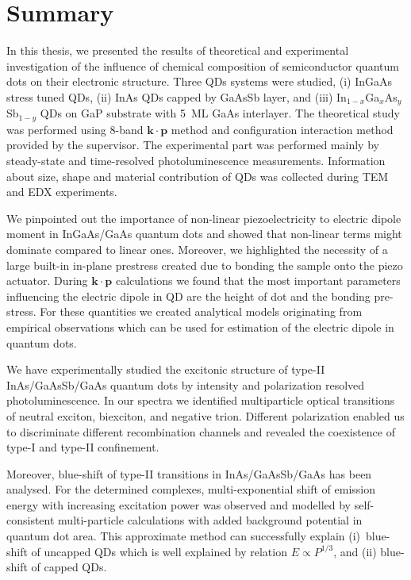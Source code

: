 
\chapter{Summary}\label{chap:summary}

In this thesis, we presented the results of theoretical and experimental investigation of the influence of chemical composition of semiconductor quantum dots on their electronic structure. Three QDs systems were studied, (i) InGaAs stress tuned QDs, (ii) InAs QDs capped by GaAsSb layer, and (iii) In$_{1-x}$Ga$_x$As$_y$Sb$_{1-y}$ QDs on GaP substrate with 5~ML GaAs interlayer. The theoretical study was performed using 8-band $\mathbf{k\cdot p}$ method and configuration interaction method provided by the supervisor. The experimental part was performed mainly by steady-state and time-resolved photoluminescence measurements. Information about size, shape and material contribution of QDs was collected during TEM and EDX experiments.

We pinpointed out the importance of non-linear piezoelectricity to electric dipole moment in InGaAs/GaAs quantum dots and showed that non-linear terms might dominate compared to linear ones. Moreover, we highlighted the necessity of a large built-in in-plane prestress created due to bonding the sample onto the piezo actuator. During $\mathbf{k\cdot p}$ calculations we found that the most important parameters influencing the electric dipole in QD are the height of dot and the bonding pre-stress. For these quantities we created analytical models originating from empirical observations which can be used for estimation of the electric dipole in quantum dots.

We have experimentally studied the excitonic structure of type-II InAs/GaAsSb/GaAs quantum dots by intensity and polarization resolved photoluminescence. In our spectra we identified multiparticle optical transitions of neutral exciton, biexciton, and negative trion. Different polarization enabled us to discriminate different recombination channels and revealed the coexistence of type-I and type-II confinement.

Moreover, blue-shift of type-II transitions in InAs/GaAsSb/GaAs has been analysed. For the determined complexes, multi-exponential shift of emission energy with increasing excitation power was observed and modelled by self-consistent multi-particle calculations with added background potential in quantum dot area. This approximate method can successfully explain (i)~blue-shift of uncapped QDs which is well explained by relation $E\propto P^{1/3}$, and (ii) blue-shift of capped QDs.

